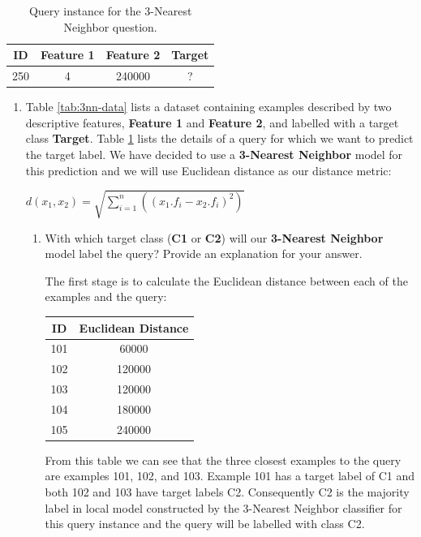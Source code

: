 \documentclass[--SOLUTION-OPTION--]{ditpaper}
\begin{document}
\begin{table}[htdp]
\caption{Query instance for the 3-Nearest Neighbor question.}
\begin{center}
\begin{tabular}{|c|c|c|c|}
\hline
ID & Feature 1 & Feature 2  & Target \\
\hline
250 & 4 &	240000 & ?\\
\hline
\end{tabular}
\end{center}
\label{tab:3nn-query}
\end{table}%
			
\question 
	\begin{enumerate}	
		\item Table \ref{tab:3nn-data} lists a dataset containing examples described by two descriptive features, \textbf{Feature 1} and \textbf{Feature 2}, and labelled with a target class \textbf{Target}. Table \ref{tab:3nn-query} lists the details of a query for which we want to predict the target label. We have decided to use a \textbf{3-Nearest Neighbor} model for this prediction and we will use Euclidean distance as our distance metric: 
								\begin{center}
								$d(x_1,x_2)=\sqrt{\sum_{i=1}^{n} \left(\left(x_1.f_i - x_2.f_i \right)^2 \right)}$
								\end{center}					
		\begin{enumerate}
				\item With which target class (\textbf{C1}  or \textbf{C2}) will our \textbf{3-Nearest Neighbor} model label the query? Provide an explanation for your answer.				
				\begin{answer}
					The first stage is to calculate the Euclidean distance between each of the examples and the query:
					\begin{center}
						\begin{tabular}{|c|c|}
						ID & Euclidean Distance \\
						\hline
						101 & 60000\\
						102 & 120000\\
						103 & 120000\\
						104 & 180000\\
						105 & 240000\\
						\hline
						\end{tabular}
					\end{center}
				 From this table we can see that the three closest examples to the query are examples 101, 102, and 103. Example 101 has a target label of C1 and both 102 and 103 have target labels C2. Consequently C2 is the majority label in local model constructed by the 3-Nearest Neighbor classifier for this query instance and the query will be labelled with class C2.

\end{answer}
\end{enumerate}
\end{enumerate}
\end{document}
